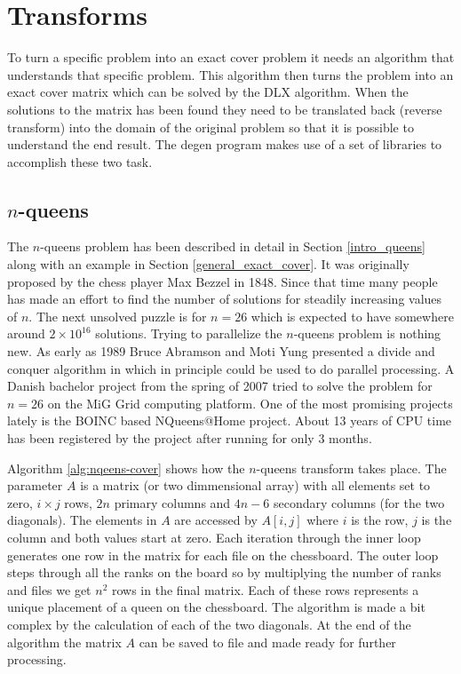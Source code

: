 \section{Transforms}
\label{transforms}

To turn a specific problem into an exact cover problem it needs an algorithm that understands that specific problem.
This algorithm then turns the problem into an exact cover matrix which can be solved by the DLX algorithm.
When the solutions to the matrix has been found they need to be translated back (reverse transform) into the domain of the original problem so that it is possible to understand the end result.
The degen program makes use of a set of libraries to accomplish these two task.


\subsection{\texorpdfstring{$n$}{n}-queens}
\label{queens_trans}

The $n$-queens problem has been described in detail in Section \ref{intro_queens} along with an example in Section \ref{general_exact_cover}.
It was originally proposed by the chess player Max Bezzel in 1848.
Since that time many people has made an effort to find the number of solutions for steadily increasing values of $n$.
The next unsolved puzzle is for $n = 26$ which is expected to have somewhere around $2 \times 10^{16}$ solutions.
Trying to parallelize the $n$-queens problem is nothing new.
As early as 1989 Bruce Abramson and Moti Yung presented a divide and conquer algorithm in \cite{Abramson89} which in principle could be used to do parallel processing.
A Danish bachelor project from the spring of 2007 \cite{queens-mig} tried to solve the problem for $n=26$ on the MiG \cite{mig} Grid computing platform.
One of the most promising projects lately is the BOINC based NQueens@Home \cite{nqueensathome} project.
About 13 years of CPU time has been registered by the project after running for only 3 months.

Algorithm \ref{alg:nqeens-cover} shows how the $n$-queens transform takes place.
The parameter $A$ is a matrix (or two dimmensional array) with all elements set to zero, $i \times j$ rows, $2n$ primary columns and $4n - 6$ secondary columns (for the two diagonals).
The elements in $A$ are accessed by $A[i,j]$ where $i$ is the row, $j$ is the column and both values start at zero.
Each iteration through the inner loop generates one row in the matrix for each file on the chessboard.
The outer loop steps through all the ranks on the board so by multiplying the number of ranks and files we get $n^2$ rows in the final matrix.
Each of these rows represents a unique placement of a queen on the chessboard.
The algorithm is made a bit complex by the calculation of each of the two diagonals.
At the end of the algorithm the matrix $A$ can be saved to file and made ready for further processing.

